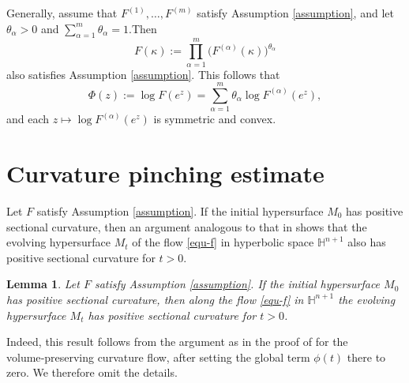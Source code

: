 \documentclass[11pt,reqno]{amsart}
\newtheorem{lemma}[proposition]{Lemma}
\theoremstyle{remark}
\numberwithin{equation}{section}
\begin{document}
Generally, assume that $F^{(1)},\dots,F^{(m)}$ satisfy Assumption \ref{assumption}, and let $\theta_\alpha>0$ and $\sum_{\alpha=1}^m \theta_\alpha=1$.Then
\[
F(\kappa):=\prod_{\alpha=1}^m \big(F^{(\alpha)}(\kappa)\big)^{\theta_\alpha}
\]
also satisfies Assumption \ref{assumption}. This follows that 
\[\Phi(z):=\log F(e^z)
=\sum_{\alpha=1}^m \theta_\alpha
\log F^{(\alpha)}(e^z),
\]
and  each $z\mapsto \log F^{(\alpha)}(e^z)$ is symmetric and convex.





\section{Curvature pinching estimate}\label{sec4}

Let $F$ satisfy Assumption \ref{assumption}. If the initial hypersurface $M_0$ has positive sectional curvature, then an argument analogous to that in \cite[Theorem 3.1]{ACW21} shows that the evolving hypersurface $M_t$ of the flow \eqref{equ-f} in hyperbolic space $\mathbb{H}^{n+1}$ also has positive sectional curvature for $t>0$. 
\begin{lemma}\label{s3.lem-psc}
	Let $F$ satisfy Assumption \ref{assumption}. If the initial hypersurface $M_0$ has positive sectional curvature, then along the flow \eqref{equ-f} in $\mathbb{H}^{n+1}$ the evolving hypersurface $M_t$ has positive sectional curvature for $t>0$.
\end{lemma}

Indeed, this result follows from the argument as in the proof of \cite[Theorem 3.1]{ACW21} for the volume‑preserving curvature flow, after  setting the global term $\phi(t)$ there to zero. We therefore omit the details.
\end{document}
